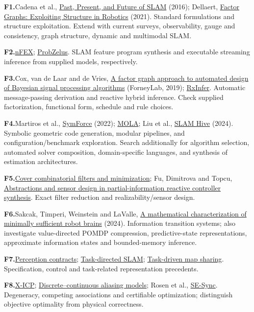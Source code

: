 \documentclass[11pt,letterpaper]{article}
\newcommand{\refitem}[2]{\par\noindent\textbf{#1}\enspace #2}
\begin{document}
\refitem{F1.}{Cadena et al., \href{https://doi.org/10.1109/TRO.2016.2624754}{Past, Present, and Future of SLAM} (2016); Dellaert, \href{https://doi.org/10.1146/annurev-control-061520-010504}{Factor Graphs: Exploiting Structure in Robotics} (2021). Standard formulations and structure exploitation. Extend with current surveys, observability, gauge and consistency, graph structure, dynamic and multimodal SLAM.}
\refitem{F2.}{\href{https://arxiv.org/abs/2407.06889}{nFEX}; \href{https://www.di.ens.fr/~pouzet/bib/pldi2020-extended.pdf}{ProbZelus}. SLAM feature program synthesis and executable streaming inference from supplied models, respectively.}
\refitem{F3.}{Cox, van de Laar and de Vries, \href{https://doi.org/10.1016/j.ijar.2018.11.002}{A factor graph approach to automated design of Bayesian signal processing algorithms} (ForneyLab, 2019); \href{https://docs.rxinfer.com/stable/}{RxInfer}. Automatic message-passing derivation and reactive hybrid inference. Check supplied factorization, functional form, schedule and rule choices.}
\refitem{F4.}{Martiros et al., \href{https://arxiv.org/abs/2204.07889}{SymForce} (2022); \href{https://docs.mola-slam.org/}{MOLA}; Liu et al., \href{https://arxiv.org/abs/2406.17586}{SLAM Hive} (2024). Symbolic geometric code generation, modular pipelines, and configuration/benchmark exploration. Search additionally for algorithm selection, automated solver composition, domain-specific languages, and synthesis of estimation architectures.}
\refitem{F5.}{\href{https://cse-robotics.engr.tamu.edu/dshell/papers/wafr2020coverfilters.pdf}{Cover combinatorial filters and minimization}; Fu, Dimitrova and Topcu, \href{https://arxiv.org/abs/1405.1630}{Abstractions and sensor design in partial-information reactive controller synthesis}. Exact filter reduction and realizability/sensor design.}
\refitem{F6.}{Sakcak, Timperi, Weinstein and LaValle, \href{https://doi.org/10.1177/02783649231198898}{A mathematical characterization of minimally sufficient robot brains} (2024). Information transition systems; also investigate value-directed POMDP compression, predictive-state representations, approximate information states and bounded-memory inference.}
\refitem{F7.}{\href{https://doi.org/10.1145/3622875}{Perception contracts}; \href{https://www.cs.mcgill.ca/~jpineau/files/aguez-icra10.pdf}{Task-directed SLAM}; \href{https://arxiv.org/abs/2403.14780}{Task-driven map sharing}. Specification, control and task-related representation precedents.}
\refitem{F8.}{\href{https://openreview.net/pdf/61fa1cd87e0ee13561e9802bc4b25a6d8dbee573.pdf}{X-ICP}; \href{https://dspace.mit.edu/entities/publication/f99b1b0d-e444-4c91-bb07-744d6c42fa5a}{Discrete--continuous aliasing models}; Rosen et al., \href{https://doi.org/10.1177/0278364918784361}{SE-Sync}. Degeneracy, competing associations and certifiable optimization; distinguish objective optimality from physical correctness.}
\end{document}

